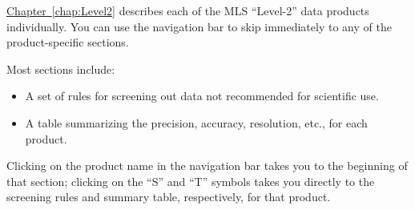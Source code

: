 {\vspace{\navguidegap}
%
\hyperref[chap:Level2]{Chapter~\ref*{chap:Level2}} describes each of the MLS ``\mbox{Level-2}'' data products individually.  You can use the navigation bar to skip immediately to any of the product-specific sections.

\vspace{2ex}Most sections include:
\begin{itemize}
  \item 
    A set of rules for screening out data not recommended for scientific use.
  \item
    A table summarizing the precision, accuracy, resolution, etc., for each product.
\end{itemize}

Clicking on the product name in the navigation bar takes you to the beginning of that section; clicking on the ``S'' and ``T'' symbols takes you directly to the screening rules and summary table, respectively, for that product.}
\label{sec:NavGuide}
\clearpage
\renewcommand{\currentnav}{BLANK}
